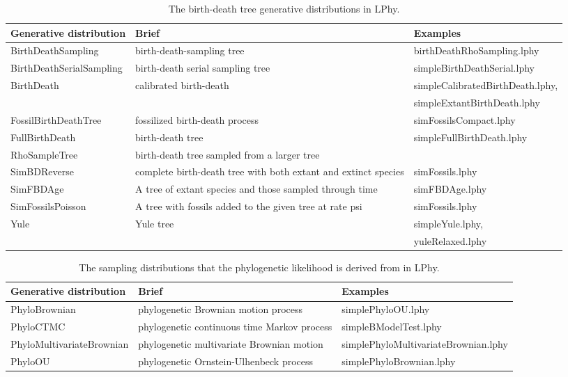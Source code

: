 \documentclass[12pt]{article} %
\begin{document}
\begin{table}
\scriptsize
\begin{tabular}{ l | p{8cm} | p{4cm} }
    \hline\hline
    \bf Generative distribution & \bf Brief & \bf Examples \\ 
    \hline\hline
    BirthDeathSampling & birth-death-sampling tree\cite{stadler2011mammalian,stadler2012estimatingdata} & birthDeathRhoSampling.lphy\\  
    BirthDeathSerialSampling & birth-death serial sampling tree\cite{stadler2013dating} & simpleBirthDeathSerial.lphy\\  
    BirthDeath & calibrated birth-death\cite{heled2015calibrated} & simpleCalibratedBirthDeath.lphy, \\ & & simpleExtantBirthDeath.lphy\\  
    FossilBirthDeathTree & fossilized birth-death process\cite{heath2014fossilized} & simFossilsCompact.lphy\\  
    FullBirthDeath & birth-death tree\cite{kendall1948generalized} & simpleFullBirthDeath.lphy\\  
    RhoSampleTree & birth-death tree sampled from a larger tree & \\  
    SimBDReverse & complete birth-death tree with both extant and extinct species & simFossils.lphy\\  
    SimFBDAge & A tree of extant species and those sampled through time & simFBDAge.lphy\\  
    SimFossilsPoisson & A tree with fossils added to the given tree at rate psi & simFossils.lphy\\  
    Yule & Yule tree\cite{yule1925ii} & simpleYule.lphy, \\ 
    & & yuleRelaxed.lphy\\  
    \hline
\end{tabular}

\label{tab:coalescent}
\caption{The birth-death tree generative distributions in LPhy.}
\end{table}

\begin{table}
\scriptsize
\begin{tabular}{ l | l | l }
    \hline\hline
    Generative distribution & Brief & Examples \\ 
    \hline\hline
    PhyloBrownian & phylogenetic Brownian motion process\cite{felsenstein1973maximum} & simplePhyloOU.lphy\\  
    PhyloCTMC & phylogenetic continuous time Markov process\cite{felsenstein1981} & simpleBModelTest.lphy\\  
    PhyloMultivariateBrownian & phylogenetic multivariate Brownian motion & simplePhyloMultivariateBrownian.lphy\\  
    PhyloOU & phylogenetic Ornstein-Ulhenbeck process\cite{felsenstein1973maximum} & simplePhyloBrownian.lphy\\  
    \hline
\end{tabular}

\label{tab:coalescent}
\caption{The sampling distributions that the phylogenetic likelihood is derived from in LPhy.}
\end{table}
\end{document}
